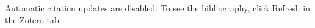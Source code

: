 
Automatic citation updates are disabled. To see the bibliography, click Refresh in the Zotero tab. 

